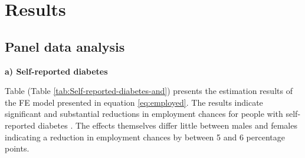 \section{\label{sec:RESULTS} Results}


\subsection{Panel data analysis}

\textbf{a) Self-reported diabetes}

Table (Table \ref{tab:Self-reported-diabetes-and}) presents the estimation results of the \ac{FE} model presented in equation \ref{eq:employed}. The results indicate significant and substantial
reductions in employment chances for people with self-reported diabetes
. The effects themselves
differ little between males and females indicating a reduction in
employment chances by between 5 and 6 percentage points. 
